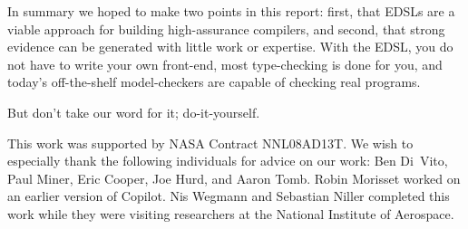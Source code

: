 \documentclass[preprint]{sigplanconf}
\begin{document}
In summary we hoped to make two points in this report: first, that EDSLs are a
viable approach for building high-assurance compilers, and second, that strong
evidence can be generated with little work or expertise.  With the EDSL, you do
not have to write your own front-end, most type-checking is done for you, and
today's off-the-shelf model-checkers are capable of checking real programs.

But don't take our word for it; do-it-yourself.

\acks 

This work was supported by NASA Contract NNL08AD13T.  We wish to especially
thank the following individuals for advice on our work: Ben Di~Vito, Paul Miner,
Eric Cooper, Joe Hurd, and Aaron Tomb.  Robin Morisset worked on an
earlier version of Copilot.  Nis Wegmann and Sebastian Niller completed this
work while they were visiting researchers at the National Institute of
Aerospace.   





\end{document}

